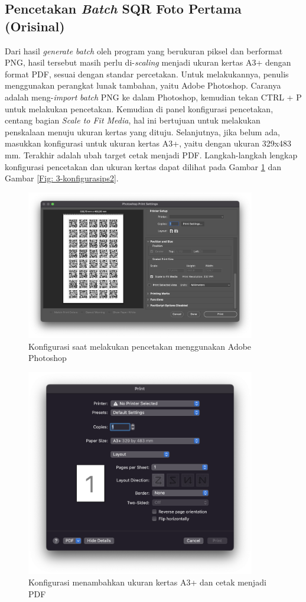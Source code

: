 \subsection{Pencetakan \emph{Batch} SQR Foto Pertama (Orisinal)} Dari hasil \emph{generate batch} oleh program yang berukuran piksel dan berformat PNG, hasil tersebut masih perlu
di-\emph{scaling} menjadi ukuran kertas A3+ dengan format PDF, sesuai dengan standar percetakan. Untuk melakukannya, penulis menggunakan perangkat lunak
tambahan, yaitu Adobe Photoshop. Caranya adalah meng-\emph{import} \emph{batch} PNG ke dalam Photoshop, kemudian tekan CTRL + P untuk melakukan pencetakan.
Kemudian di panel konfigurasi pencetakan, centang bagian \emph{Scale to Fit Media}, hal ini bertujuan untuk melakukan penskalaan menuju ukuran kertas yang
dituju. Selanjutnya, jika belum ada, masukkan konfigurasi untuk ukuran kertas A3+, yaitu dengan ukuran 329x483 mm. Terakhir adalah ubah target cetak menjadi
PDF. Langkah-langkah lengkap konfigurasi pencetakan dan ukuran kertas dapat dilihat pada Gambar \ref{Fig: 3-konfigurasips1} dan Gambar \ref{Fig:
	3-konfigurasips2}.

\begin{figure}[h]
	\centering
	\includegraphics[width=10cm]{contents/chapter-3/3-konfigurasips1.png}
	\caption{Konfigurasi saat melakukan pencetakan menggunakan Adobe Photoshop}
	\label{Fig: 3-konfigurasips1}
\end{figure}

\begin{figure}[h]
	\centering
	\includegraphics[width=10cm]{contents/chapter-3/3-konfigurasips2.png}
	\caption{Konfigurasi menambahkan ukuran kertas A3+ dan cetak menjadi PDF}
	\label{Fig: 3-konfigurasips2}
\end{figure}

